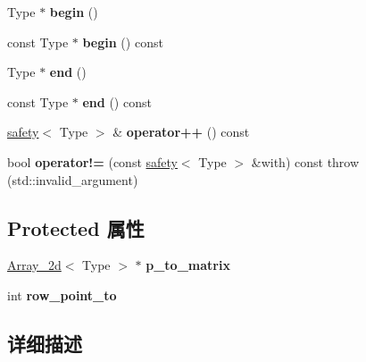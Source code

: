 \begin{DoxyCompactItemize}
\item 
\mbox{\label{classarray__2d_1_1safety_a82e6de1d53a4bf72c71ab3f284b4a44e}} 
Type $\ast$ {\bfseries begin} ()
\item 
\mbox{\label{classarray__2d_1_1safety_af961feb8ac1d6fc9d63e635606df1838}} 
const Type $\ast$ {\bfseries begin} () const
\item 
\mbox{\label{classarray__2d_1_1safety_a813f90461d559d594ecc090c6496ccd2}} 
Type $\ast$ {\bfseries end} ()
\item 
\mbox{\label{classarray__2d_1_1safety_a850ef1405ec9a08b99a862b4a2c57c60}} 
const Type $\ast$ {\bfseries end} () const
\item 
\mbox{\label{classarray__2d_1_1safety_a877ff78ab131e52b0082f29ca819307c}} 
\hyperlink{classarray__2d_1_1safety}{safety}$<$ Type $>$ \& {\bfseries operator++} () const
\item 
\mbox{\label{classarray__2d_1_1safety_a3d2466fa6ca80e7a7fe2e3bf13bd4cca}} 
bool {\bfseries operator!=} (const \hyperlink{classarray__2d_1_1safety}{safety}$<$ Type $>$ \&with) const  throw (std\+::invalid\+\_\+argument)
\end{DoxyCompactItemize}
\subsection*{Protected 属性}
\begin{DoxyCompactItemize}
\item 
\mbox{\label{classarray__2d_1_1safety_afdf823bf641c38b501fe89176c1bc0cd}} 
\hyperlink{classarray__2d_1_1_array__2d}{Array\+\_\+2d}$<$ Type $>$ $\ast$ {\bfseries p\+\_\+to\+\_\+matrix}
\item 
\mbox{\label{classarray__2d_1_1safety_a8b3d7d7ad8172bc5afdfa0870787e366}} 
int {\bfseries row\+\_\+point\+\_\+to}
\end{DoxyCompactItemize}


\subsection{详细描述}
